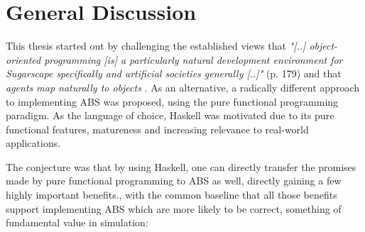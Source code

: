 \chapter{General Discussion}
\label{ch:discussion}
This thesis started out by challenging the established views that \textit{"[..] object-oriented programming [is] a particularly natural development environment for Sugarscape specifically and artificial societies generally [..]"} \cite{epstein_growing_1996} (p. 179) and that \textit{agents map naturally to objects} \cite{north_managing_2007}. As an alternative, a radically different approach to implementing ABS was proposed, using the pure functional programming paradigm. As the language of choice, Haskell was motivated due to its pure functional features, matureness and increasing relevance to real-world applications. 

The conjecture was that by using Haskell, one can directly transfer the promises made by pure functional programming to ABS as well, directly gaining a few highly important benefits., with the common baseline that all those benefits support implementing ABS which are more likely to be correct, something of fundamental value in simulation:


